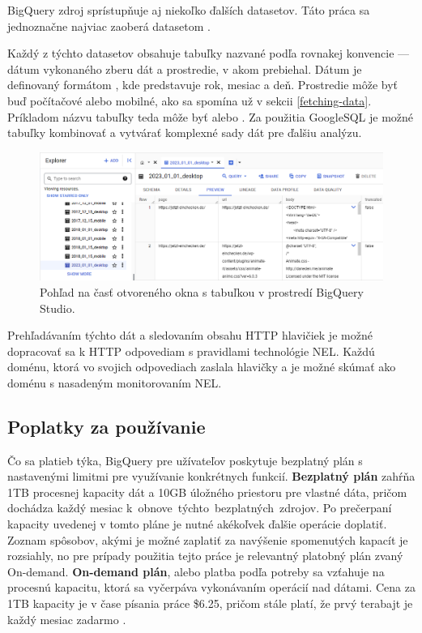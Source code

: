 BigQuery zdroj  sprístupňuje aj niekoľko ďalších datasetov. Táto práca sa jednoznačne najviac zaoberá datasetom .

Každý z týchto datasetov obsahuje tabuľky nazvané podľa rovnakej konvencie --- dátum vykonaného zberu dát a prostredie, v akom prebiehal.
Dátum je definovaný formátom , kde  predstavuje rok,  mesiac a  deň. 
Prostredie môže byť buď počítačové alebo mobilné, ako sa spomína už v sekcii \ref{fetching-data}.
Príkladom názvu tabuľky teda môže byť  alebo .
Za použitia GoogleSQL je možné tabuľky kombinovať a vytvárať komplexné sady dát pre ďalšiu analýzu.

\begin{figure}[htb]
\begin{center}
 \includegraphics[scale=0.53]{obrazky-figures/bigquery_response_bodies.png}    
 \caption{\centering Pohľad na časť otvoreného okna s tabuľkou  v prostredí BigQuery Studio.}
 \label{img:bigquery-example-table}
\end{center}
\end{figure}

Prehľadávaním týchto dát a sledovaním obsahu HTTP hlavičiek je možné dopracovať sa k HTTP odpovediam s pravidlami technológie NEL.
Každú doménu, ktorá vo svojich odpovediach zaslala hlavičky  a  je možné skúmať ako doménu s nasadeným monitorovaním NEL.

\subsection{Poplatky za používanie}

Čo sa platieb týka, BigQuery pre užívateľov poskytuje bezplatný plán s nastavenými limitmi pre využívanie konkrétnych funkcií.
\textbf{Bezplatný plán} zahŕňa 1TB procesnej kapacity dát a 10GB úložného priestoru pre vlastné dáta, pričom dochádza každý mesiac \mbox{k obnove týchto bezplatných zdrojov}.
Po prečerpaní kapacity uvedenej v tomto pláne je nutné akékoľvek ďalšie operácie doplatiť.
Zoznam spôsobov, akými je možné zaplatiť za navýšenie spomenutých kapacít je rozsiahly, no pre prípady použitia tejto práce je relevantný platobný plán zvaný On-demand.
\textbf{On-demand plán}, alebo platba podľa potreby sa vzťahuje na procesnú kapacitu, ktorá sa vyčerpáva vykonávaním operácií nad dátami.
Cena za 1TB kapacity je v čase písania práce \$6.25, pričom stále platí, že prvý terabajt je každý mesiac zadarmo \cite{google-bq-pricing}.
